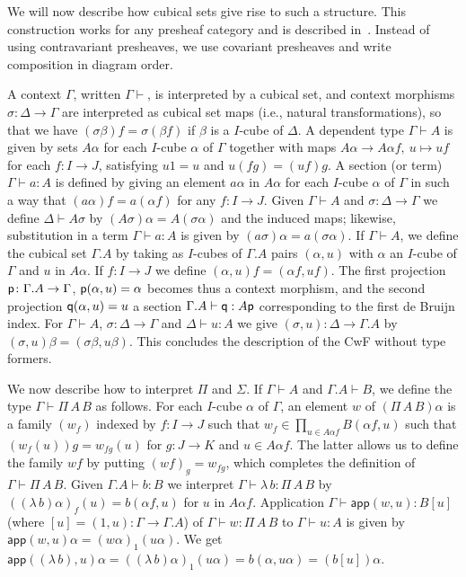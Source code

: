 \documentclass[10pt,a4paper]{article}
\newcommand{\app}{\mathsf{app}}
\newcommand{\pp}{{\sf p}}
\newcommand{\qq}{{\sf q}}
\begin{document}
We will now describe how cubical sets give rise to such a structure.
This construction works for any presheaf category and is described
in~\cite[Sec.~4]{Hofmann}.  Instead of using contravariant presheaves,
we use covariant presheaves and write composition in diagram order.

A context $\Gamma$, written $\Gamma \vdash$, is interpreted by a
cubical set, and context morphisms $\sigma:\Delta\to\Gamma$ are
interpreted as cubical set maps (i.e., natural transformations), so
that we have $(\sigma\beta)f = \sigma(\beta f)$ if $\beta$ is a
$I$-cube of $\Delta$.  A dependent type $\Gamma\vdash A$ is given by
sets $A\alpha$ for each $I$-cube $\alpha$ of $\Gamma$ together with
maps $A\alpha\to A\alpha f,~u\longmapsto uf$ for each $f \colon I \to
J$, satisfying $u1 = u$ and $u(fg) = (uf)g$.  A section (or term)
$\Gamma\vdash a:A$ is defined by giving an element $a\alpha$ in
$A\alpha$ for each $I$-cube $\alpha$ of $\Gamma$ in such a way that
$(a\alpha) f = a (\alpha f)$ for any $f \colon I \to J$.  Given
$\Gamma \vdash A$ and $\sigma \colon \Delta \to \Gamma$ we define
$\Delta \vdash A \sigma$ by $(A \sigma) \alpha = A (\sigma \alpha)$
and the induced maps; likewise, substitution in a term $\Gamma \vdash
a : A$ is given by $(a \sigma) \alpha = a (\sigma \alpha)$.  If
$\Gamma\vdash A$, we define the cubical set $\Gamma.A$ by taking as
$I$-cubes of $\Gamma.A$ pairs $(\alpha,u)$ with $\alpha$ an $I$-cube
of $\Gamma$ and $u$ in $A\alpha$. If $f:I\to J$ we define $(\alpha,u)f
= (\alpha f,u f)$.  The first projection $\pp \colon \Gamma.A \to
\Gamma$, $\pp (\alpha, u) = \alpha$ becomes thus a context morphism,
and the second projection $\qq (\alpha, u) = u$ a section $\Gamma.A
\vdash \qq : A \pp$ corresponding to the first de Bruijn index.  For
$\Gamma \vdash A$, $\sigma \colon \Delta \to \Gamma$ and $\Delta
\vdash u : A$ we give $(\sigma, u) \colon \Delta \to \Gamma.A$ by
$(\sigma, u) \beta = (\sigma \beta, u \beta)$.  This concludes the
description of the CwF without type formers.

We now describe how to interpret $\Pi$ and $\Sigma$. If $\Gamma\vdash
A$ and $\Gamma.A\vdash B$, we define the type $\Gamma\vdash \Pi\,A\,B$
as follows.  For each $I$-cube $\alpha$ of $\Gamma$, an element $w$ of
$(\Pi\,A\,B)\alpha$ is a family $(w_f)$ indexed by $f:I\to J$ such
that $w_f \in \prod_{u \in A \alpha f} B (\alpha f, u)$ such that
$(w_f (u)) g = w_{fg} (u)$ for $g \colon J \to K$ and $u \in A \alpha
f$.  The latter allows us to define the family $wf$ by putting $(wf)_g
= w_{fg}$, which completes the definition of $\Gamma\vdash \Pi\,A\,B$.
Given $\Gamma.A \vdash b : B$ we interpret $\Gamma \vdash \lambda\,b :
\Pi\,A\,B$ by $ ((\lambda\, b) \alpha)_f (u) = b (\alpha f, u)$ for
$u$ in $A \alpha f$.  Application $\Gamma \vdash \app (w,u) : B [u]$
(where $[u] = (1, u) \colon \Gamma \to \Gamma.A$) of $\Gamma \vdash w
: \Pi\,A\,B$ to $\Gamma \vdash u : A$ is given by $\app (w, u) \alpha
= (w\alpha)_1 (u\alpha)$.  We get $\app ((\lambda\,b), u) \alpha =
((\lambda\,b) \alpha)_1 (u \alpha) = b (\alpha, u\alpha) = (b [u])
\alpha$.
\end{document}
